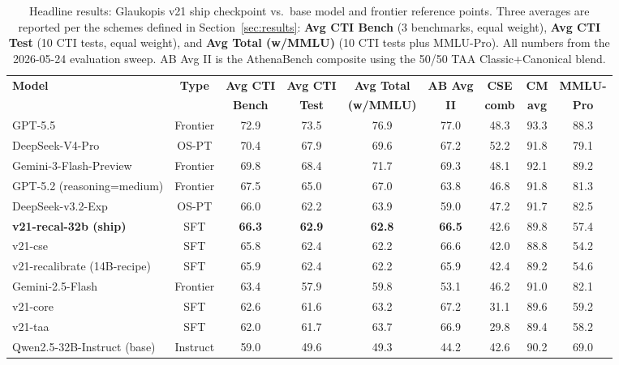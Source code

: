 \documentclass[conference]{IEEEtran}
\begin{document}
\begin{table}[t]
\centering
\caption{Headline results: Glaukopis v21 ship checkpoint vs.\ base model and frontier reference points. Three averages are reported per the schemes defined in Section~\ref{sec:results}: \textbf{Avg CTI Bench} (3 benchmarks, equal weight), \textbf{Avg CTI Test} (10 CTI tests, equal weight), and \textbf{Avg Total (w/MMLU)} (10 CTI tests plus MMLU-Pro). All numbers from the 2026-05-24 evaluation sweep. AB Avg II is the AthenaBench composite using the 50/50 TAA Classic+Canonical blend.}
\label{tab:results-headline}
\small
\setlength{\tabcolsep}{4pt}
\begin{tabular}{lcccccccc}
\hline
\textbf{Model} & \textbf{Type} & \textbf{Avg CTI} & \textbf{Avg CTI} & \textbf{Avg Total} & \textbf{AB Avg} & \textbf{CSE} & \textbf{CM} & \textbf{MMLU-} \\
               &               & \textbf{Bench}   & \textbf{Test}    & \textbf{(w/MMLU)}  & \textbf{II}    & \textbf{comb} & \textbf{avg} & \textbf{Pro} \\
\hline
GPT-5.5                                  & Frontier  & 72.9 & 73.5 & 76.9 & 77.0 & 48.3 & 93.3 & 88.3 \\
DeepSeek-V4-Pro                          & OS-PT     & 70.4 & 67.9 & 69.6 & 67.2 & 52.2 & 91.8 & 79.1 \\
Gemini-3-Flash-Preview                   & Frontier  & 69.8 & 68.4 & 71.7 & 69.3 & 48.1 & 92.1 & 89.2 \\
GPT-5.2 (reasoning=medium)               & Frontier  & 67.5 & 65.0 & 67.0 & 63.8 & 46.8 & 91.8 & 81.3 \\
DeepSeek-v3.2-Exp                        & OS-PT     & 66.0 & 62.2 & 63.9 & 59.0 & 47.2 & 91.7 & 82.5 \\
\textbf{v21-recal-32b (ship)}            & SFT       & \textbf{66.3} & \textbf{62.9} & \textbf{62.8} & \textbf{66.5} & 42.6 & 89.8 & 57.4 \\
v21-cse                                  & SFT       & 65.8 & 62.4 & 62.2 & 66.6 & 42.0 & 88.8 & 54.2 \\
v21-recalibrate (14B-recipe)             & SFT       & 65.9 & 62.4 & 62.2 & 65.9 & 42.4 & 89.2 & 54.6 \\
Gemini-2.5-Flash                         & Frontier  & 63.4 & 57.9 & 59.8 & 53.1 & 46.2 & 91.0 & 82.1 \\
v21-core                                 & SFT       & 62.6 & 61.6 & 63.2 & 67.2 & 31.1 & 89.6 & 59.2 \\
v21-taa                                  & SFT       & 62.0 & 61.7 & 63.7 & 66.9 & 29.8 & 89.4 & 58.2 \\
Qwen2.5-32B-Instruct (base)              & Instruct  & 59.0 & 49.6 & 49.3 & 44.2 & 42.6 & 90.2 & 69.0 \\
\hline
\end{tabular}
\end{table}
\end{document}

